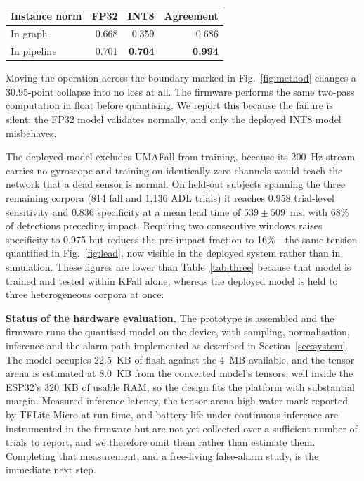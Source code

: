 \documentclass[conference]{IEEEtran}
\begin{document}
\begin{center}\small
\begin{tabular}{lrrr}
\toprule
Instance norm & FP32 & INT8 & Agreement \\
\midrule
In graph    & 0.668 & 0.359 & 0.686 \\
In pipeline & 0.701 & \textbf{0.704} & \textbf{0.994} \\
\bottomrule
\end{tabular}
\end{center}

Moving the operation across the boundary marked in Fig.~\ref{fig:method} changes a
30.95-point collapse into no loss at all. The firmware performs the same two-pass
computation in float before quantising. We report this because the failure is silent:
the FP32 model validates normally, and only the deployed INT8 model misbehaves.

The deployed model excludes UMAFall from training, because its 200~Hz stream carries
no gyroscope and training on identically zero channels would teach the network that a
dead sensor is normal. On held-out subjects spanning the three remaining corpora (814
fall and 1{,}136 ADL trials) it reaches 0.958 trial-level sensitivity and 0.836
specificity at a mean lead time of $539\pm509$~ms, with 68\% of detections preceding
impact. Requiring two consecutive windows raises specificity to 0.975 but reduces the
pre-impact fraction to 16\%---the same tension quantified in Fig.~\ref{fig:lead}, now
visible in the deployed system rather than in simulation. These figures are lower than
Table~\ref{tab:three} because that model is trained and tested within KFall alone,
whereas the deployed model is held to three heterogeneous corpora at once.

\textbf{Status of the hardware evaluation.} The prototype is assembled and the
firmware runs the quantised model on the device, with sampling, normalisation,
inference and the alarm path implemented as described in Section~\ref{sec:system}.
The model occupies 22.5~KB of flash against the 4~MB available, and the tensor arena
is estimated at 8.0~KB from the converted model's tensors, well inside the ESP32's
320~KB of usable RAM, so the design fits the platform with substantial margin.
Measured inference latency, the tensor-arena high-water mark reported by TFLite Micro
at run time, and battery life under continuous inference are instrumented in the
firmware but are not yet collected over a sufficient number of trials to report, and
we therefore omit them rather than estimate them. Completing that measurement, and a
free-living false-alarm study, is the immediate next step.
\end{document}
